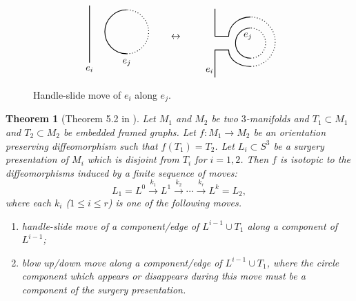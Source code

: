 \documentclass[12pt]{amsart}
\newtheorem{theo}{Theorem}[section]
\begin{document}
\begin{figure}
\begin{eqnarray*}
\begin{tikzpicture}[baseline=-0.65ex, thick, scale=0.8]
\draw (0.5,-1.2)  to (0.5,1.4);
\draw (0.5,-1.5) node {$e_i$};
\draw [dotted](2.2,-0.8) arc (-90:90:1);
\draw (2.2,-0.8) arc (-90:-270:1);
\draw (2.2,-1.2) node {$e_j$};
\end{tikzpicture}\quad\quad \leftrightarrow \quad\quad 
\begin{tikzpicture}[baseline=-0.65ex, thick, scale=1]
\draw [dotted] (0.3, -0.8) arc (-90:90:0.55);
\draw  (0.3, -0.8) arc (-90:-270:0.55);
\draw [dotted] (0.3, -1.1) arc (-90:90:0.9);
\draw (0.3, -1.1) to [out=180,in=270] (-0.5, -0.5) to [out=180,in=0] (-1, -0.5) to [out=270,in=90] (-1, -1.5);
\draw (-1, 1) to (-1, 0) to (-0.5, 0) to [out=90,in=180] (0.3, 0.7);
\draw (-1.2, -1.25) node {$e_i$};
\draw (0.2, 0) node {$e_j$};
\end{tikzpicture}
\end{eqnarray*}
\caption{Handle-slide move of $e_i$ along $e_j$.}
\label{f4}
\end{figure}


\begin{theo}[Theorem 5.2 in \cite{MR3286896}]
\label{kirby}
Let $M_1$ and $M_2$ be two $3$-manifolds and $T_1\subset M_1$ and $T_2\subset M_2$ be embedded framed graphs. Let $f:M_1\to M_2$ be an orientation preserving diffeomorphism such that $f(T_1)=T_2$. Let $L_i\subset S^3$ be a surgery presentation of $M_i$ which is disjoint from $T_i$ for $i=1, 2$. Then $f$ is isotopic to the diffeomorphisms induced by a finite sequence of moves: 
$$L_1=L^0\xrightarrow{k_1} L^1 \xrightarrow{k_2}\cdots \xrightarrow{k_r}L^{k}=L_2,$$
where each $k_i$ ($1\leq i \leq r$) is one of the following moves.
\begin{enumerate}
\item handle-slide move of a component/edge of $L^{i-1}\cup T_1$ along a component of $L^{i-1}$;
\item blow up/down move along a component/edge of $L^{i-1}\cup T_1$, where the circle component which appears or disappears during this move must be a component of the surgery presentation.
\end{enumerate}
\end{theo}
\end{document}

